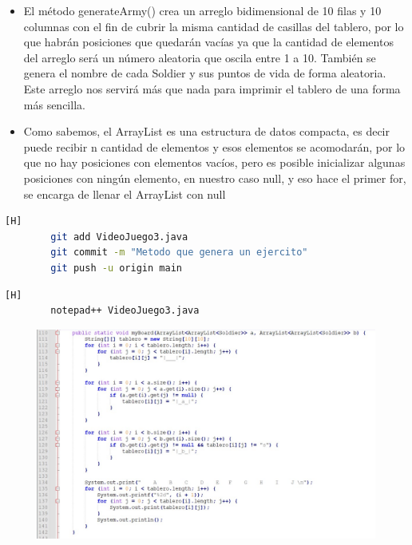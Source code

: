 \documentclass{article}
\begin{document}
	\begin{itemize}	
		\item El método generateArmy()  crea un arreglo bidimensional de 10 filas y 10 columnas con
		el fin de cubrir la misma cantidad de casillas del tablero, por
		lo que habrán posiciones que quedarán vacías ya que la cantidad de elementos del arreglo será un número aleatoria que oscila entre 1 a 10. También se genera el nombre de cada Soldier y
		sus puntos de vida de forma aleatoria. Este arreglo nos servirá más que nada para imprimir el
		tablero de una forma más sencilla.
		\item Como sabemos, el ArrayList es una estructura de datos compacta, es decir puede recibir n cantidad de elementos y esos elementos se acomodarán, por lo que no hay posiciones con elementos vacíos, pero es posible inicializar algunas posiciones con ningún elemento, en nuestro caso null, y eso hace el primer for, se encarga de llenar el ArrayList con null
	\end{itemize}
	
	
	\begin{lstlisting}[language=bash,caption={Commit: Metodo que genera un ejercito}][H]
		git add VideoJuego3.java
		git commit -m "Metodo que genera un ejercito"			
		git push -u origin main
	\end{lstlisting}
	
	\begin{lstlisting}[language=bash,caption={Se implementa el método que imprime el tablero con los soldados ya ubicados  }][H]
		notepad++ VideoJuego3.java
	\end{lstlisting}
	
		\begin{figure}[H]
		\centering
		\includegraphics[width=1\textwidth,keepaspectratio]{img/2.jpg}
	\end{figure}
	
\end{document}
